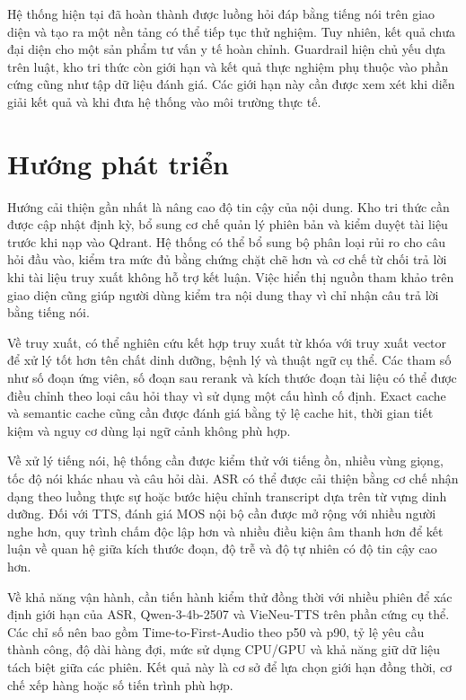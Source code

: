 \documentclass[a4paper,13pt,twoside]{report}
\begin{document}
Hệ thống hiện tại đã hoàn thành được luồng hỏi đáp bằng tiếng nói trên giao diện và tạo ra một nền tảng có thể tiếp tục thử nghiệm. Tuy nhiên, kết quả chưa đại diện cho một sản phẩm tư vấn y tế hoàn chỉnh. Guardrail hiện chủ yếu dựa trên luật, kho tri thức còn giới hạn và kết quả thực nghiệm phụ thuộc vào phần cứng cũng như tập dữ liệu đánh giá. Các giới hạn này cần được xem xét khi diễn giải kết quả và khi đưa hệ thống vào môi trường thực tế.

\section{Hướng phát triển}

Hướng cải thiện gần nhất là nâng cao độ tin cậy của nội dung. Kho tri thức cần được cập nhật định kỳ, bổ sung cơ chế quản lý phiên bản và kiểm duyệt tài liệu trước khi nạp vào Qdrant. Hệ thống có thể bổ sung bộ phân loại rủi ro cho câu hỏi đầu vào, kiểm tra mức đủ bằng chứng chặt chẽ hơn và cơ chế từ chối trả lời khi tài liệu truy xuất không hỗ trợ kết luận. Việc hiển thị nguồn tham khảo trên giao diện cũng giúp người dùng kiểm tra nội dung thay vì chỉ nhận câu trả lời bằng tiếng nói.

Về truy xuất, có thể nghiên cứu kết hợp truy xuất từ khóa với truy xuất vector để xử lý tốt hơn tên chất dinh dưỡng, bệnh lý và thuật ngữ cụ thể. Các tham số như số đoạn ứng viên, số đoạn sau rerank và kích thước đoạn tài liệu có thể được điều chỉnh theo loại câu hỏi thay vì sử dụng một cấu hình cố định. Exact cache và semantic cache cũng cần được đánh giá bằng tỷ lệ cache hit, thời gian tiết kiệm và nguy cơ dùng lại ngữ cảnh không phù hợp.

Về xử lý tiếng nói, hệ thống cần được kiểm thử với tiếng ồn, nhiều vùng giọng, tốc độ nói khác nhau và câu hỏi dài. ASR có thể được cải thiện bằng cơ chế nhận dạng theo luồng thực sự hoặc bước hiệu chỉnh transcript dựa trên từ vựng dinh dưỡng. Đối với TTS, đánh giá MOS nội bộ cần được mở rộng với nhiều người nghe hơn, quy trình chấm độc lập hơn và nhiều điều kiện âm thanh hơn để kết luận về quan hệ giữa kích thước đoạn, độ trễ và độ tự nhiên có độ tin cậy cao hơn.

Về khả năng vận hành, cần tiến hành kiểm thử đồng thời với nhiều phiên để xác định giới hạn của ASR, Qwen-3-4b-2507 và VieNeu-TTS trên phần cứng cụ thể. Các chỉ số nên bao gồm Time-to-First-Audio theo p50 và p90, tỷ lệ yêu cầu thành công, độ dài hàng đợi, mức sử dụng CPU/GPU và khả năng giữ dữ liệu tách biệt giữa các phiên. Kết quả này là cơ sở để lựa chọn giới hạn đồng thời, cơ chế xếp hàng hoặc số tiến trình phù hợp.
\end{document}
